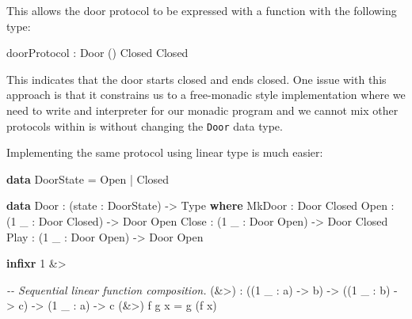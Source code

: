 \documentclass[
]{article}
\newenvironment{Shaded}{}{}
\newcommand{\CommentTok}[1]{\textcolor[rgb]{0.38,0.63,0.69}{\textit{#1}}}
\newcommand{\DataTypeTok}[1]{\textcolor[rgb]{0.56,0.13,0.00}{#1}}
\newcommand{\DecValTok}[1]{\textcolor[rgb]{0.25,0.63,0.44}{#1}}
\newcommand{\KeywordTok}[1]{\textcolor[rgb]{0.00,0.44,0.13}{\textbf{#1}}}
\newcommand{\NormalTok}[1]{#1}
\newcommand{\OperatorTok}[1]{\textcolor[rgb]{0.40,0.40,0.40}{#1}}
\newcommand{\OtherTok}[1]{\textcolor[rgb]{0.00,0.44,0.13}{#1}}
\begin{document}
This allows the door protocol to be expressed with a function with the
following type:

\begin{Shaded}
\begin{Highlighting}[]
\NormalTok{doorProtocol }\OperatorTok{:} \DataTypeTok{Door}\NormalTok{ () }\DataTypeTok{Closed} \DataTypeTok{Closed}
\end{Highlighting}
\end{Shaded}

This indicates that the door starts closed and ends closed. One issue
with this approach is that it constrains us to a free-monadic style
implementation where we need to write and interpreter for our monadic
program and we cannot mix other protocols within is without changing the
\texttt{Door} data type.

Implementing the same protocol using linear type is much easier:

\begin{Shaded}
\begin{Highlighting}[]

\KeywordTok{data} \DataTypeTok{DoorState} \OtherTok{=} \DataTypeTok{Open} \OperatorTok{|} \DataTypeTok{Closed}

\KeywordTok{data} \DataTypeTok{Door} \OperatorTok{:}\NormalTok{ (state }\OperatorTok{:} \DataTypeTok{DoorState}\NormalTok{) }\OtherTok{{-}\textgreater{}} \DataTypeTok{Type} \KeywordTok{where}
  \DataTypeTok{MkDoor} \OperatorTok{:} \DataTypeTok{Door} \DataTypeTok{Closed}
  \DataTypeTok{Open} \OperatorTok{:}\NormalTok{ (}\DecValTok{1}\NormalTok{ \_ }\OperatorTok{:} \DataTypeTok{Door} \DataTypeTok{Closed}\NormalTok{) }\OtherTok{{-}\textgreater{}} \DataTypeTok{Door} \DataTypeTok{Open}
  \DataTypeTok{Close} \OperatorTok{:}\NormalTok{ (}\DecValTok{1}\NormalTok{ \_ }\OperatorTok{:} \DataTypeTok{Door} \DataTypeTok{Open}\NormalTok{) }\OtherTok{{-}\textgreater{}} \DataTypeTok{Door} \DataTypeTok{Closed}
  \DataTypeTok{Play} \OperatorTok{:}\NormalTok{ (}\DecValTok{1}\NormalTok{ \_ }\OperatorTok{:} \DataTypeTok{Door} \DataTypeTok{Open}\NormalTok{) }\OtherTok{{-}\textgreater{}} \DataTypeTok{Door} \DataTypeTok{Open}

\KeywordTok{infixr} \DecValTok{1} \OperatorTok{\&\textgreater{}}

\CommentTok{{-}{-} Sequential linear function composition.}
\NormalTok{(}\OperatorTok{\&\textgreater{}}\NormalTok{) }\OperatorTok{:}\NormalTok{ ((}\DecValTok{1}\NormalTok{ \_ }\OperatorTok{:}\NormalTok{ a) }\OtherTok{{-}\textgreater{}}\NormalTok{ b) }\OtherTok{{-}\textgreater{}} 
\NormalTok{       ((}\DecValTok{1}\NormalTok{ \_ }\OperatorTok{:}\NormalTok{ b) }\OtherTok{{-}\textgreater{}}\NormalTok{ c) }\OtherTok{{-}\textgreater{}} 
\NormalTok{        (}\DecValTok{1}\NormalTok{ \_ }\OperatorTok{:}\NormalTok{ a) }\OtherTok{{-}\textgreater{}}\NormalTok{ c}
\NormalTok{(}\OperatorTok{\&\textgreater{}}\NormalTok{) f g x }\OtherTok{=}\NormalTok{ g (f x)}
\end{Highlighting}
\end{Shaded}
\end{document}
